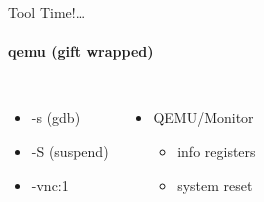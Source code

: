 \begin{frame}{Tool Time!\ldots}
    \framesubtitle{qemu (gift wrapped)}
    \begin{columns}
             {
              	\begin{itemize}
             		\item -s (gdb)
                	\item -S (suspend)
        	       	\item -vnc:1
	            \end{itemize}
            }
             {
             	\begin{itemize}
            		\item QEMU/Monitor
              		\begin{itemize}
	    	        	\item info registers
    	    	       	\item system reset
    	    	    \end{itemize}
        	    \end{itemize}
        	}
    \end{columns}
\end{frame}

